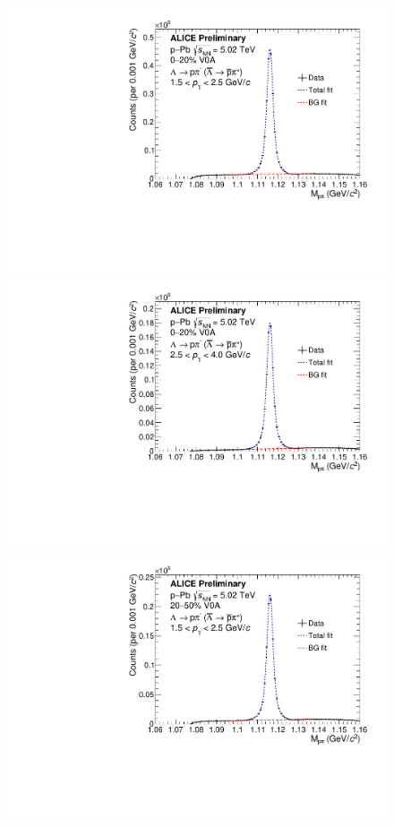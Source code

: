\begin{figure}[ht]
	\centering
	\begin{minipage}{0.48\textwidth}
		\includegraphics[width=\textwidth]{figures/analysis/lambda_mass_dist_0_20_lowpt.pdf}
	\end{minipage}
	\begin{minipage}{0.48\textwidth}
		\includegraphics[width=\textwidth]{figures/analysis/lambda_mass_dist_0_20_highpt.pdf}
	\end{minipage}
	\begin{minipage}{0.48\textwidth}
		\includegraphics[width=\textwidth]{figures/analysis/lambda_mass_dist_20_50_lowpt.pdf}

\end{minipage}
\end{figure}
